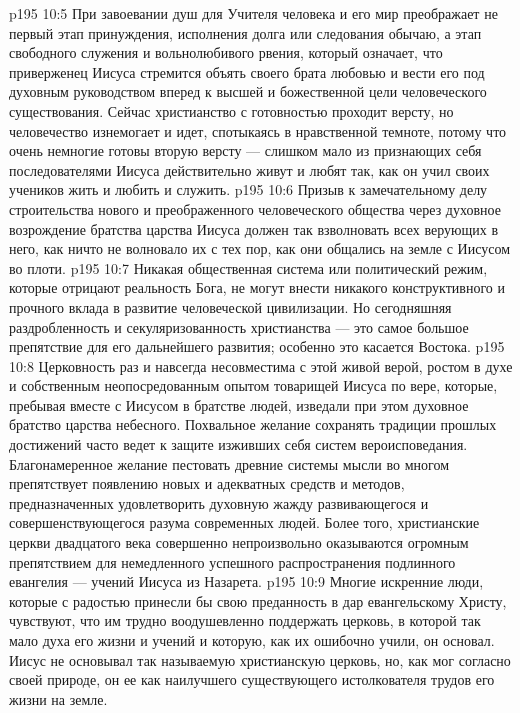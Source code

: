 \vs p195 10:5 \pc При завоевании душ для Учителя человека и его мир преображает не первый этап принуждения, исполнения долга или следования обычаю, а  этап свободного служения и вольнолюбивого рвения, который означает, что приверженец Иисуса стремится объять своего брата любовью и вести его под духовным руководством вперед к высшей и божественной цели человеческого существования. Сейчас христианство с готовностью проходит  версту, но человечество изнемогает и идет, спотыкаясь в нравственной темноте, потому что очень немногие готовы вторую версту --- слишком мало из признающих себя последователями Иисуса действительно живут и любят так, как он учил своих учеников жить и любить и служить.
\vs p195 10:6 Призыв к замечательному делу строительства нового и преображенного человеческого общества через духовное возрождение братства царства Иисуса должен так взволновать всех верующих в него, как ничто не волновало их с тех пор, как они общались на земле с Иисусом во плоти.
\vs p195 10:7 Никакая общественная система или политический режим, которые отрицают реальность Бога, не могут внести никакого конструктивного и прочного вклада в развитие человеческой цивилизации. Но сегодняшняя раздробленность и секуляризованность христианства --- это самое большое препятствие для его дальнейшего развития; особенно это касается Востока.
\vs p195 10:8 \pc Церковность раз и навсегда несовместима с этой живой верой, ростом в духе и собственным неопосредованным опытом товарищей Иисуса по вере, которые, пребывая вместе с Иисусом в братстве людей, изведали при этом духовное братство царства небесного. Похвальное желание сохранять традиции прошлых достижений часто ведет к защите изживших себя систем вероисповедания. Благонамеренное желание пестовать древние системы мысли во многом препятствует появлению новых и адекватных средств и методов, предназначенных удовлетворить духовную жажду развивающегося и совершенствующегося разума современных людей. Более того, христианские церкви двадцатого века совершенно непроизвольно оказываются огромным препятствием для немедленного успешного распространения подлинного евангелия --- учений Иисуса из Назарета.
\vs p195 10:9 Многие искренние люди, которые с радостью принесли бы свою преданность в дар евангельскому Христу, чувствуют, что им трудно воодушевленно поддержать церковь, в которой так мало духа его жизни и учений и которую, как их ошибочно учили, он основал. Иисус не основывал так называемую христианскую церковь, но, как мог согласно своей природе, он  ее как наилучшего существующего истолкователя трудов его жизни на земле.

